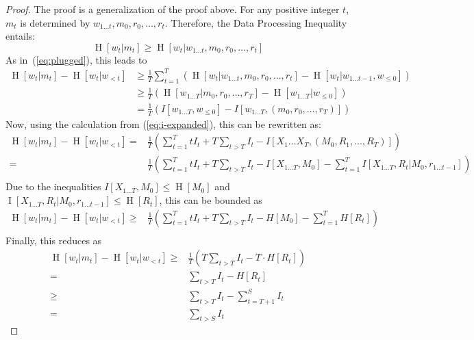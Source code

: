 \documentclass[11pt,letterpaper]{article}
\begin{document}
\begin{proof}
The proof is a generalization of the proof above.
	For any positive integer $t$, $m_t$ is determined by $w_{1\dots t}, m_0, r_0, \dots, r_t$.
	Therefore, the Data Processing Inequality entails:
	\begin{equation}
		\operatorname{H}[w_t|m_t] \geq \operatorname{H}[w_t|w_{1\dots t}, m_0, r_0, \dots, r_t]
	\end{equation}
	As in~(\ref{eq:plugged}), this leads to
\begin{align}
\operatorname{H}[w_t | m_t] - \operatorname{H}[w_t | w_{<t}]& \geq \frac{1}{T} \sum_{t=1}^T ( \operatorname{H}[w_t|w_{1\dots t}, m_0, r_0, \dots, r_t] - \operatorname{H}[w_t | w_{1\dots t-1}, w_{\leq 0}]  )    \\
& \geq \frac{1}{T} \left(\operatorname{H}[w_{1\dots T} | m_0, r_0, \dots, r_T] - \operatorname{H}[w_{1\dots T} | w_{\leq 0}]\right)  \\
	& = \frac{1}{T} \left(I[w_{1\dots T}, w_{\leq 0}] - I[w_{1\dots T}, (m_0, r_0, \dots, r_T)]\right) 
\end{align}
	Now, using the calculation from (\ref{eq:i-expanded}), this can be rewritten as:
	\begin{align*}
\operatorname{H}[w_t | m_t] - \operatorname{H}[w_t | w_{<t}]= & \frac{1}{T}\left(\sum_{t=1}^T t I_t + T \sum_{t>T} I_t - I[X_1\dots X_T, (M_0, R_1, ..., R_T)]\right) \\
		= & \frac{1}{T}\left(\sum_{t=1}^T t I_t + T \sum_{t>T} I_t - I[X_{1\dots T}, M_0] - \sum_{t=1}^T I[X_{1\dots T}, R_t|M_0, r_{1\dots t-1}]\right) \\
	\end{align*}
	Due to the inequalities $I[X_{1\dots T}, M_0] \leq \operatorname{H}[M_0]$ and $\operatorname{I}[X_{1\dots T}, R_t|M_0, r_{1\dots t-1}] \leq \operatorname{H}[R_t]$, this can be bounded as
	\begin{align}
\operatorname{H}[w_t | m_t] - \operatorname{H}[w_t | w_{<t}]		\geq & \frac{1}{T}\left(\sum_{t=1}^T t I_t  + T \sum_{t>T} I_t-H[M_0] - \sum_{t=1}^T H[R_t]\right) \\
	\end{align}
	Finally, this reduces as
	\begin{align}
	\operatorname{H}[w_t | m_t] - \operatorname{H}[w_t | w_{<t}]		\geq &  \frac{1}{T}(T \sum_{t>T} I_t - T\cdot H[R_t]) \\
	= & \sum_{t>T} I_t- H[R_t]  \\
		\geq & \sum_{t>T} I_t - \sum_{t=T+1}^S I_t \\
		= &  \sum_{t>S} I_t
\end{align}

\end{proof}
\end{document}
